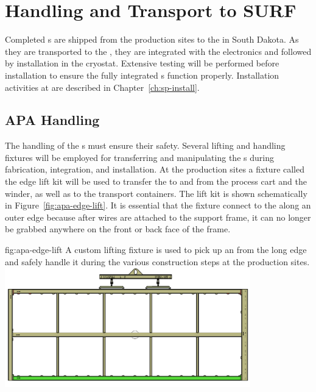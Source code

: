 \section{Handling and Transport to SURF} %
\label{sec:fdsp-apa-transport}

Completed s are shipped from the  production sites to 
the  in South Dakota. As they are transported to the , they are integrated %
with the   electronics and  followed by installation in the cryostat. %
Extensive  testing will be performed before installation to ensure the fully integrated s function properly.  %
Installation activities at  are described in Chapter~\ref{ch:sp-install}. 

\subsection{APA Handling}
\label{sec:fdsp-apa-transport-handling}

The handling of the s  must %
ensure their safety.  Several lifting and handling fixtures will be employed for transferring and manipulating the s during fabrication, integration, and installation.  At the production sites a fixture called the edge lift kit will be used to transfer the  to and from the process cart and the winder, as well as to the transport containers.  The lift kit is shown schematically in Figure~\ref{fig:apa-edge-lift}.  It is essential that the fixture connect to the  along an outer edge because after wires are attached to the support frame, it can no longer be grabbed anywhere on the front or back face of the frame. 

\begin{dunefigure}{fig:apa-edge-lift}
{A custom lifting fixture is used to pick up an  from the long edge and safely handle it during the various construction steps at the production sites.}  
\includegraphics[width=0.8\textwidth]{graphics/sp-apa-edge-lift-kit.png} 
\end{dunefigure}

